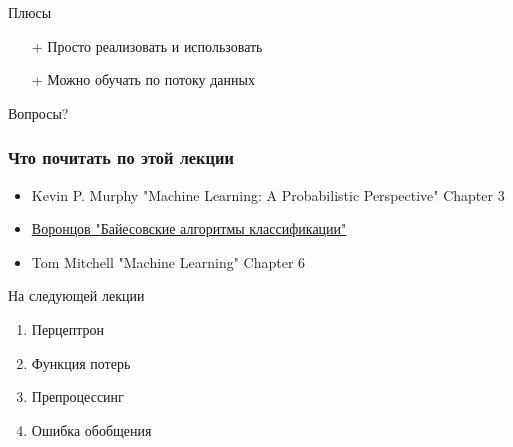 \documentclass[10pt]{beamer}
\begin{document}
\begin{frame}{Плюсы}
  \begin{itemize} [<+->]
    \item[+] Просто реализовать и использовать
    \item[+] Можно обучать по потоку данных
  \end{itemize}
\end{frame}

\begin{frame}[standout]
  Вопросы?
\end{frame}

\appendix

\begin{frame}\frametitle{Что почитать по этой лекции}
  \begin{itemize}
    \item Kevin P. Murphy "Machine Learning: A Probabilistic Perspective" Chapter 3
    \item \href{http://www.ccas.ru/voron/download/Bayes.pdf}{Воронцов "Байесовские алгоритмы классификации"}
    \item Tom Mitchell "Machine Learning" Chapter 6
  \end{itemize}
\end{frame}

\begin{frame}{На следующей лекции}
  	\begin{enumerate} [--]
		\item Перцептрон
		\item Функция потерь
		\item Препроцессинг
		\item Ошибка обобщения
	\end{enumerate}
\end{frame}
\end{document}
